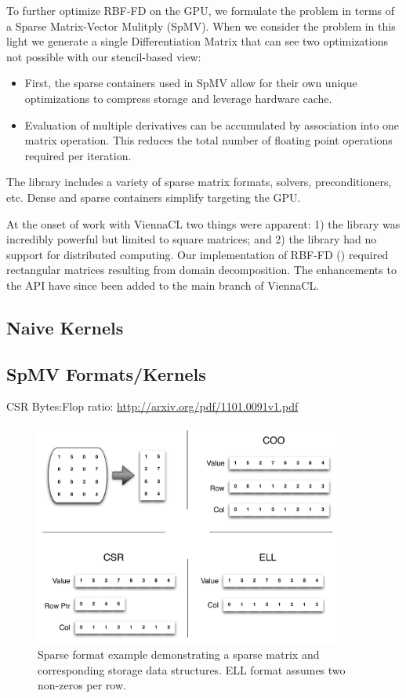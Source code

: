 \documentclass{report}
\begin{document}
To further optimize RBF-FD on the GPU, we formulate the problem in terms of a Sparse Matrix-Vector Mulitply (SpMV). When we consider the problem in this light we generate a single Differentiation Matrix that can see two optimizations not possible with our stencil-based view: 
\begin{itemize} 
\item First, the sparse containers used in SpMV allow for their own unique optimizations to compress storage and leverage hardware cache.
\item Evaluation of multiple derivatives can be accumulated by association into one matrix operation. This reduces the total number of floating point operations required per iteration. 
\end{itemize}


The library includes a variety of sparse matrix formats, solvers, preconditioners, etc. Dense and sparse containers simplify targeting the GPU. 

At the onset of work with ViennaCL two things were apparent: 1) the library was incredibly powerful but limited to square matrices; and 2) the library had no support for distributed computing. Our implementation of RBF-FD (\cite{BolligRBFFDGPU}) required rectangular matrices resulting from domain decomposition. The enhancements to the API have since been added to the main branch of ViennaCL. 

\subsection{Naive Kernels}
\subsection{SpMV Formats/Kernels}


CSR Bytes:Flop ratio: \url{http://arxiv.org/pdf/1101.0091v1.pdf}

\begin{figure}
\centering
\includegraphics[width=0.9\textwidth]{gpu_content/omnigraffle/SparseStorage.pdf}
\caption{Sparse format example demonstrating a sparse matrix and corresponding storage data structures. ELL format assumes two non-zeros per row. }
\label{fig:sparse_format}
\end{figure}
\end{document}
